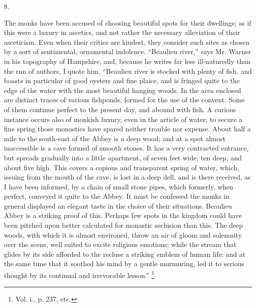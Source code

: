 8.

The monks have been accused of choosing beautiful spots for their
dwellings; as if this were a luxury in ascetics, and not rather the
necessary alleviation of their asceticism. Even when their critics are
kindest, they consider such sites as chosen by a sort of sentimental,
ornamental indolence. ``Beaulieu river,'' says Mr. Warner in
his topography of Hampshire, and, because he writes far less
ill-naturedly than the run of authors, I quote him, ``Beaulieu
river is stocked with plenty of fish, and boasts in particular of good
oysters and fine plaice, and is fringed quite to the edge of the water
with the most beautiful hanging woods. In the area enclosed are
distinct traces of various fishponds, formed for the use of the
convent. Some of them continue perfect to the present day, and abound
with fish. A curious instance occurs also of monkish luxury, even in
the article of water; to secure a fine spring those monastics have
spared neither trouble nor expense. About half a mile to the
south-east of the Abbey is a deep wood; and at a spot almost
inaccessible is a cave formed of smooth stones. It has a very
contracted entrance, but spreads gradually into a little apartment, of
seven feet wide, ten deep, and about five high. This covers a copious
and transparent spring of water, which, issuing from the mouth of the
cave, is lost in a deep dell, and is there received, as I have been
informed, by a chain of small stone pipes, which formerly, when
perfect, conveyed it quite to the Abbey. It must be confessed the
monks in general displayed an elegant taste in the choice of their
situations. Beaulieu Abbey is a striking proof of this. Perhaps few
spots in the kingdom could have been pitched upon better calculated
for monastic seclusion than this. The deep woods, with which it
is almost environed, throw an air of gloom and solemnity over the
scene, well suited to excite religious emotions; while the stream that
glides by its side afforded to the recluse a striking emblem of human
life: and at the same time that it soothed his mind by a gentle
murmuring, led it to serious thought by its continual and irrevocable
lesson.'' \footnote{Vol. i., p.
237, etc.}


